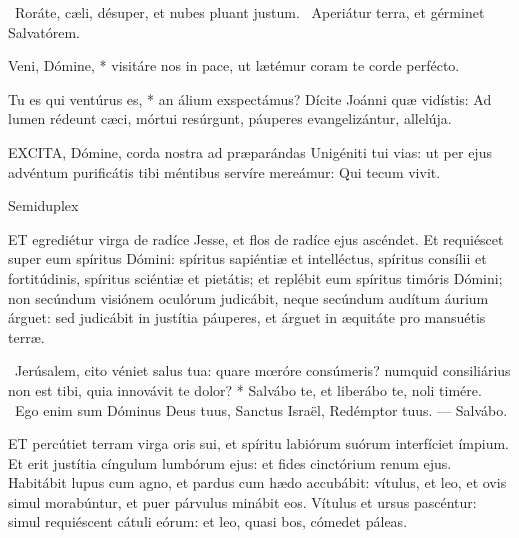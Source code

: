 \V\ Roráte, cæli, désuper, et nubes pluant justum. \R\ Aperiátur terra, et gérminet Salvatórem.

 Veni, Dómine, * visitáre nos in pace, ut lætémur coram te corde perfécto.


 Tu es qui ventúrus es, * an álium exspectámus? Dícite Joánni quæ vidístis: Ad lumen rédeunt cæci, mórtui resúrgunt, páuperes evangelizántur, allelúja.


\lettrine[lines=2]{E}{XCITA}, Dómine, corda nostra ad præparándas Unigéniti tui vias: ut per ejus advéntum purificátis tibi méntibus servíre mereámur: Qui tecum vivit.

\sectionornament


 Semiduplex




\lettrine[lines=2]{E}{T} egrediétur virga de radíce Jesse, et flos de radíce ejus ascéndet. Et requiéscet super eum spíritus Dómini: spíritus sapiéntiæ et intelléctus, spíritus consílii et fortitúdinis, spíritus sciéntiæ et pietátis; et replébit eum spíritus timóris Dómini; non secúndum visiónem oculórum judicábit, neque secúndum audítum áurium árguet: sed judicábit in justítia páuperes, et árguet in æquitáte pro mansuétis terræ.


\R\ Jerúsalem, cito véniet salus tua: quare mœróre consúmeris? numquid consiliárius non est tibi, quia innovávit te dolor? * Salvábo te, et liberábo te, noli timére. \V\ Ego enim sum Dóminus Deus tuus, Sanctus Israël, Redémptor tuus. --- Salvábo.


\lettrine[lines=2]{E}{T} percútiet terram virga oris sui, et spíritu labiórum suórum interfíciet ímpium. Et erit justítia cíngulum lumbórum ejus: et fides cinctórium renum ejus. Habitábit lupus cum agno, et pardus cum hædo accubábit: vítulus, et leo, et ovis simul morabúntur, et puer párvulus minábit eos. Vítulus et ursus pascéntur: simul requiéscent cátuli eórum: et leo, quasi bos, cómedet páleas.

